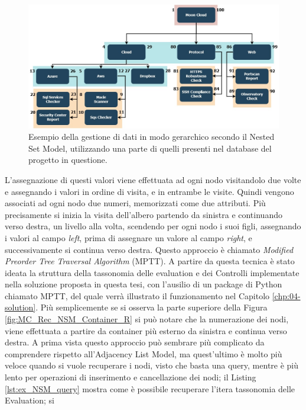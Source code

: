 \begin{figure}[ht!]
    \centering
    \includegraphics[scale=0.53]{images/MC_Rec_NSM_Tree.jpg}
    \caption[Gestione di dati (visione ad albero) secondo il NSM]{Esempio della gestione di dati in modo gerarchico secondo il Nested Set Model, utilizzando una parte di quelli presenti nel database del 
    progetto in questione.}
    \label{fig:MC_Rec_NSM_Tree}
\end{figure}
\hfill\break
L'assegnazione di questi valori viene effettuata ad ogni nodo visitandolo due volte e assegnando i valori in ordine di visita, e in entrambe le visite. 
Quindi vengono associati ad ogni nodo due numeri, memorizzati come due attributi. 
Più precisamente si inizia la visita dell'albero partendo da sinistra e continuando verso destra, un livello alla volta, scendendo per ogni 
nodo i suoi figli, assegnando i valori al campo \textit{left}, prima di assegnare un valore al campo \textit{right}, e successivamente si continua verso 
destra. Questo approccio è chiamato \textit{Modified Preorder Tree Traversal Algorithm} (MPTT). A partire da questa tecnica è stato 
ideata la struttura della tassonomia delle evaluation e dei Controlli implementate nella soluzione proposta in questa tesi, con 
l'ausilio di un package di Python chiamato MPTT, del quale verrà illustrato il funzionamento nel Capitolo \ref{chp:04-solution}.\hfill\break
Più semplicemente se si osserva la parte superiore della Figura \ref{fig:MC_Rec_NSM_Container_R} si può notare che la numerazione dei nodi, viene 
effettuata a partire da container più esterno da sinistra e continua verso destra.\hfill\break
A prima vista questo approccio può sembrare più complicato da comprendere rispetto all'Adjacency List Model, ma quest'ultimo è 
molto più veloce quando si vuole recuperare i nodi, visto che basta una query, mentre è più lento per operazioni di inserimento e 
cancellazione dei nodi; il Listing \ref{lst:ex_NSM_query} mostra come è possibile recuperare l'itera tassonomia delle Evaluation; si 
